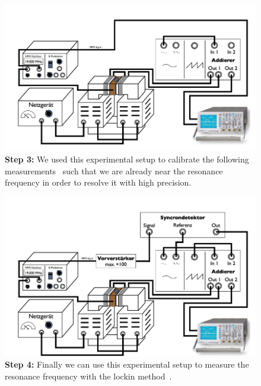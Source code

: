\begin{figure}[htpb]
    \centering
    \includegraphics[width=0.8\linewidth]{figures/setup3}
    \caption{\textbf{Step 3:}
        We used this experimental setup to calibrate the following
        measurements~\cite{ver} such that we are already
        near the resonance frequency in order to resolve it with high
        precision.}
    \label{fig:figures/setup1}
\end{figure}
\begin{figure}[htpb]
    \centering
    \includegraphics[width=0.8\linewidth]{figures/setup4}
    \caption{\textbf{Step 4:}
        Finally we can use this experimental setup to measure
        the resonance frequency with the lockin method~\cite{ver}.}
    \label{fig:figures/setup1}
\end{figure}
\clearpage
